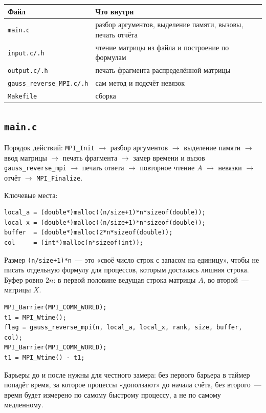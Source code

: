 \documentclass[11pt,a4paper]{report}
\begin{document}
\begin{center}
\begin{tabular}{ll}
\toprule
Файл & Что внутри \\
\midrule
\texttt{main.c} & разбор аргументов, выделение памяти, вызовы, печать отчёта \\
\texttt{input.c/.h} & чтение матрицы из файла и построение по формулам \\
\texttt{output.c/.h} & печать фрагмента распределённой матрицы \\
\texttt{gauss\_reverse\_MPI.c/.h} & сам метод и подсчёт невязок \\
\texttt{Makefile} & сборка \\
\bottomrule
\end{tabular}
\end{center}

\subsection{\texttt{main.c}}

Порядок действий: \texttt{MPI\_Init} $\to$ разбор аргументов $\to$ выделение
памяти $\to$ ввод матрицы $\to$ печать фрагмента $\to$ замер времени и вызов
\texttt{gauss\_reverse\_mpi} $\to$ печать ответа $\to$ повторное чтение $A$
$\to$ невязки $\to$ отчёт $\to$ \texttt{MPI\_Finalize}.

Ключевые места:

\begin{lstlisting}[style=c]
local_a = (double*)malloc((n/size+1)*n*sizeof(double));
local_x = (double*)malloc((n/size+1)*n*sizeof(double));
buffer  = (double*)malloc(2*n*sizeof(double));
col     = (int*)malloc(n*sizeof(int));
\end{lstlisting}
Размер \texttt{(n/size+1)*n}~--- это «своё число строк с запасом на единицу»,
чтобы не писать отдельную формулу для процессов, которым досталась лишняя
строка. Буфер ровно $2n$: в первой половине ведущая строка матрицы $A$, во
второй~--- матрицы $X$.

\begin{lstlisting}[style=c]
MPI_Barrier(MPI_COMM_WORLD);
t1 = MPI_Wtime();
flag = gauss_reverse_mpi(n, local_a, local_x, rank, size, buffer, col);
MPI_Barrier(MPI_COMM_WORLD);
t1 = MPI_Wtime() - t1;
\end{lstlisting}
Барьеры до и после нужны для честного замера: без первого барьера в таймер
попадёт время, за которое процессы «доползают» до начала счёта, без второго~---
время будет измерено по самому быстрому процессу, а не по самому медленному.
\end{document}
